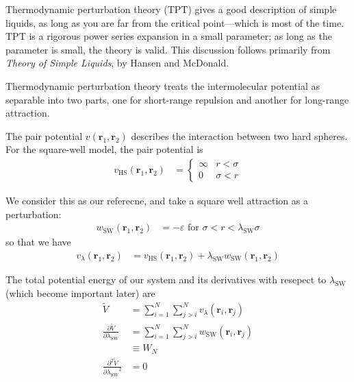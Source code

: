 \documentclass[letterpaper,twocolumn,amsmath,amssymb,prb]{revtex4-1}
\newcommand{\lambdaSW}{\ensuremath{\lambda_\text{SW}}}
\newcommand{\1}{\ensuremath{\textbf{r}_1}}
\newcommand{\2}{\ensuremath{\textbf{r}_2}}
\newcommand{\3}{\ensuremath{\textbf{r}_3}}
\newcommand{\4}{\ensuremath{\textbf{r}_4}}
\begin{document}
Thermodynamic perturbation theory (TPT) gives a good description of
simple liquids, as long as you are far from the critical point---which
is most of the time. TPT is a rigorous power series
expansion in a small parameter; as long as the parameter is small, the
theory is valid. This discussion follows primarily from \textit{Theory
  of Simple Liquids}, by Hansen and McDonald\cite{Hansen06}.

Thermodynamic perturbation theory treats the intermolecular potential
as separable into two parts, one for short-range repulsion and another
for long-range attraction.

The pair potential $v(\1,\2)$ describes the interaction between two
hard spheres. For the square-well model, the pair potential is
\begin{align}
  v_\text{HS}(\1,\2) &=
    \begin{cases}
      \infty & r < \sigma \\
      0 & \sigma < r
    \end{cases}
\end{align}

We consider this as our referecne, and take a square well attraction as a perturbation:
\begin{align}
  w_\text{SW}(\1,\2) &= - \varepsilon \text{ for } \sigma < r < \lambdaSW\sigma
\end{align}
so that we have
\begin{align}
  v_\lambda(\1,\2) &= v_\text{HS}(\1,\2) + \lambdaSW w_\text{SW}(\1,\2) \label{eqn:small-perturbation}
\end{align}

The total potential energy of our system and its derivatives with
resepect to $\lambdaSW$ (which become important later) are
\begin{align}
  \widetilde{V} &= \sum_{i=1}^N\sum_{j>i}^N v_\lambda(\mathbf{r}_i,\mathbf{r}_j) \\ %
  \frac{\partial \widetilde{V}}{\partial\lambdaSW} &= \sum_{i=1}^N\sum_{j>i}^N w_\text{SW}(\mathbf{r}_i,\mathbf{r}_j) \nonumber \\
  &\equiv W_N \\
  \frac{\partial^2 \widetilde{V}}{\partial\lambdaSW^2} &= 0
\end{align}
\end{document}
